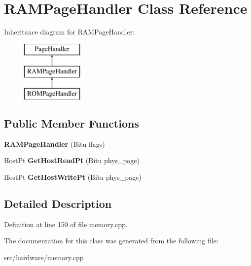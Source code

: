 \hypertarget{classRAMPageHandler}{\section{R\-A\-M\-Page\-Handler Class Reference}
\label{classRAMPageHandler}
}
Inheritance diagram for R\-A\-M\-Page\-Handler\-:\begin{figure}[H]
\begin{center}
\leavevmode
\includegraphics[height=3.000000cm]{classRAMPageHandler}
\end{center}
\end{figure}
\subsection*{Public Member Functions}
\begin{DoxyCompactItemize}
\item 
\hypertarget{classRAMPageHandler_a1a9d31214da07316be390b315bd48344}{{\bfseries R\-A\-M\-Page\-Handler} (Bitu flags)}\label{classRAMPageHandler_a1a9d31214da07316be390b315bd48344}

\item 
\hypertarget{classRAMPageHandler_aa96438cf48e183202b6d9bdef1ff858a}{Host\-Pt {\bfseries Get\-Host\-Read\-Pt} (Bitu phys\-\_\-page)}\label{classRAMPageHandler_aa96438cf48e183202b6d9bdef1ff858a}

\item 
\hypertarget{classRAMPageHandler_a08d7b2d963c5afb626c6aea199bc3a1b}{Host\-Pt {\bfseries Get\-Host\-Write\-Pt} (Bitu phys\-\_\-page)}\label{classRAMPageHandler_a08d7b2d963c5afb626c6aea199bc3a1b}

\end{DoxyCompactItemize}


\subsection{Detailed Description}


Definition at line 150 of file memory.\-cpp.



The documentation for this class was generated from the following file\-:\begin{DoxyCompactItemize}
\item 
src/hardware/memory.\-cpp\end{DoxyCompactItemize}
